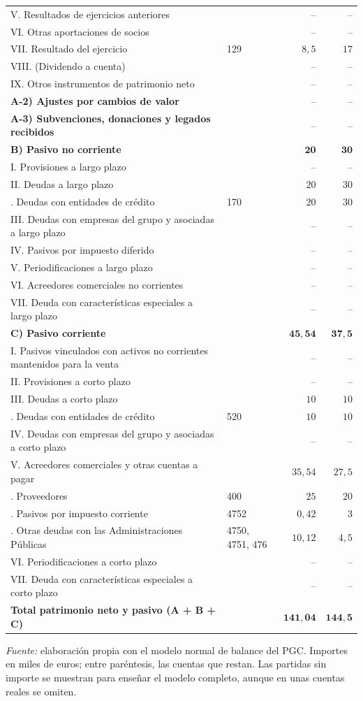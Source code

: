 \documentclass[10pt,a4paper]{article}
\begin{document}
\begin{center}
\begin{minipage}{\linewidth}
{\begin{tabular}{p{8.1cm} p{3.4cm} r r}
\qquad V. Resultados de ejercicios anteriores & & -- & -- \tabularnewline
\qquad VI. Otras aportaciones de socios & & -- & -- \tabularnewline
\qquad VII. Resultado del ejercicio & \raggedright 129 & $8,5$ & $17$ \tabularnewline
\qquad VIII. (Dividendo a cuenta) & & -- & -- \tabularnewline
\qquad IX. Otros instrumentos de patrimonio neto & & -- & -- \tabularnewline
\quad \textbf{A-2) Ajustes por cambios de valor} & & -- & -- \tabularnewline
\quad \textbf{A-3) Subvenciones, donaciones y legados recibidos} & & -- & -- \tabularnewline
\textbf{B) Pasivo no corriente} & & $\mathbf{20}$ & $\mathbf{30}$ \tabularnewline
\quad I. Provisiones a largo plazo & & -- & -- \tabularnewline
\quad II. Deudas a largo plazo & & $20$ & $30$ \tabularnewline
\qquad 2. Deudas con entidades de crédito & \raggedright 170 & $20$ & $30$ \tabularnewline
\quad III. Deudas con empresas del grupo y asociadas a largo plazo & & -- & -- \tabularnewline
\quad IV. Pasivos por impuesto diferido & & -- & -- \tabularnewline
\quad V. Periodificaciones a largo plazo & & -- & -- \tabularnewline
\quad VI. Acreedores comerciales no corrientes & & -- & -- \tabularnewline
\quad VII. Deuda con características especiales a largo plazo & & -- & -- \tabularnewline
\textbf{C) Pasivo corriente} & & $\mathbf{45,54}$ & $\mathbf{37,5}$ \tabularnewline
\quad I. Pasivos vinculados con activos no corrientes mantenidos para la venta & & -- & -- \tabularnewline
\quad II. Provisiones a corto plazo & & -- & -- \tabularnewline
\quad III. Deudas a corto plazo & & $10$ & $10$ \tabularnewline
\qquad 2. Deudas con entidades de crédito & \raggedright 520 & $10$ & $10$ \tabularnewline
\quad IV. Deudas con empresas del grupo y asociadas a corto plazo & & -- & -- \tabularnewline
\quad V. Acreedores comerciales y otras cuentas a pagar & & $35,54$ & $27,5$ \tabularnewline
\qquad 1. Proveedores & \raggedright 400 & $25$ & $20$ \tabularnewline
\qquad 5. Pasivos por impuesto corriente & \raggedright 4752 & $0,42$ & $3$ \tabularnewline
\qquad 6. Otras deudas con las Administraciones Públicas & \raggedright 4750, 4751, 476 & $10,12$ & $4,5$ \tabularnewline
\quad VI. Periodificaciones a corto plazo & & -- & -- \tabularnewline
\quad VII. Deuda con características especiales a corto plazo & & -- & -- \tabularnewline
\textbf{Total patrimonio neto y pasivo (A + B + C)} & & $\mathbf{141,04}$ & $\mathbf{144,5}$ \tabularnewline
\hline
\end{tabular}}\par\vspace{0.3em}
{\small\textit{Fuente: }elaboración propia con el modelo normal de balance del PGC. Importes en miles de euros; entre paréntesis, las cuentas que restan. Las partidas sin importe se muestran para enseñar el modelo completo, aunque en unas cuentas reales se omiten.}
\end{minipage}\end{center}
\end{document}
